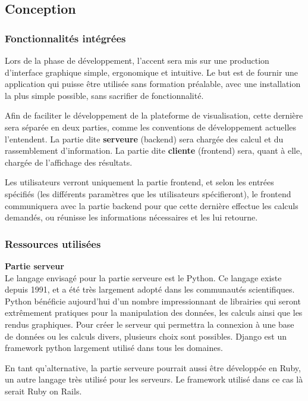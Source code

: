 \subsection{Conception}

\subsubsection{Fonctionnalités intégrées}
Lors de la phase de développement, l'accent sera mis sur une production d'interface graphique simple, ergonomique et intuitive.
Le but est de fournir une application qui puisse être utilisée sans formation préalable, avec une installation la plus simple possible, sans sacrifier de fonctionnalité.

Afin de faciliter le développement de la plateforme de visualisation, cette dernière sera séparée en deux parties, comme les conventions de développement actuelles l'entendent. 
La partie dite \textbf{serveure} (backend) sera chargée des calcul et du rassemblement d'information. 
La partie dite \textbf{cliente} (frontend) sera, quant à elle, chargée de l'affichage des résultats.

Les utilisateurs verront uniquement la partie frontend, et selon les entrées spécifiés (les différents paramètres que les utilisateurs spécifieront), le frontend communiquera avec la partie backend pour que cette dernière effectue les calculs demandés, ou réunisse les informations nécessaires et les lui retourne.

\subsubsection{Ressources utilisées}

\textbf{Partie serveur} \\
Le langage envisagé pour la partie serveure est le Python.
Ce langage existe depuis 1991, et a été très largement adopté dans les communautés scientifiques.
Python bénéficie aujourd'hui d'un nombre impressionnant de librairies qui seront extrêmement pratiques pour la manipulation des données, les calculs ainsi que les rendus graphiques.
Pour créer le serveur qui permettra la connexion à une base de données ou les calculs divers, plusieurs choix sont possibles.
Django est un framework python largement utilisé dans tous les domaines.

En tant qu'alternative, la partie serveure pourrait aussi être développée en Ruby, un autre langage très utilisé pour les serveurs.
Le framework utilisé dans ce cas là serait Ruby on Rails.

